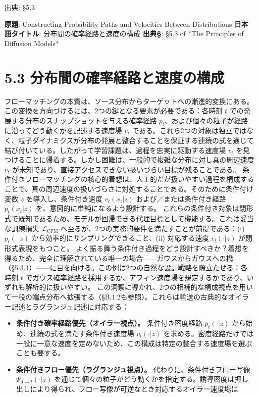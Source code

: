 

{\color{gray}\footnotesize 出典: §5.3\par}
\vspace{0.2em}
\begin{propositionbox}[原題]
\textbf{原題}: Constructing Probability Paths and Velocities Between Distributions
\textbf{日本語タイトル}: 分布間の確率経路と速度の構成
\textbf{出典§}: §5.3 of *The Principles of Diffusion Models*
\end{propositionbox}


\section*{5.3 分布間の確率経路と速度の構成}


フローマッチングの本質は、ソース分布からターゲットへの漸進的変換にある。この変換を方向づけるには、2つの鍵となる要素が必要である：各時刻 $t$ での発展する分布のスナップショットを与える確率経路 $p_t$、および個々の粒子が経路に沿ってどう動くかを記述する速度場 $v_t$ である。これら2つの対象は独立ではなく、粒子ダイナミクスが分布の発展と整合することを保証する連続の式を通じて結び付いている。したがって学習課題は、過程を忠実に駆動する速度場 $v_t$ を見つけることに帰着する。しかし困難は、一般的で複雑な分布に対し真の周辺速度 $v_t$ が未知であり、直接アクセスできない扱いづらい目標が残ることである。
条件付きフローマッチングの核心的着想は、人工的だが扱いやすい過程を構成することで、真の周辺速度の扱いづらさに対処することである。そのために条件付け変数 $z$ を導入し、条件付き速度 $v_t(x_t|z)$ および／または条件付き経路 $p_t(x_t|z)$ を、意図的に単純になるよう設計する。
これらの条件付き対象は閉形式で既知であるため、モデルが回帰できる代理目標として機能する。これは妥当な訓練損失 $\mathcal{L}_{\mathrm{CFM}}$ へ至るが、2つの実務的要件を満たすことが前提である：(i) $p_t(\cdot|z)$ から効率的にサンプリングできること、(ii) 対応する速度 $v_t(\cdot|z)$ が閉形式表現をもつこと。
よく振る舞う条件付き過程をどう設計すべきか？着想を得るため、完全に理解されている唯一の場合——ガウスからガウスへの橋（§5.3.1）——に目を向ける。この例は2つの自然な設計戦略を際立たせる：各時刻 $t$ でガウス確率経路を採用するか、アフィン速度場を規定するかであり、いずれも解析的に扱いやすい。
この洞察に導かれ、2つの相補的な構成視点を用いて一般の端点分布へ拡張する（§B.1.2も参照）。これらは輸送の古典的なオイラー記述とラグランジュ記述に対応する：

\begin{itemize}
\item \textbf{条件付き確率経路優先（オイラー視点）。} 条件付き密度経路 $p_t(\cdot|z)$ から始め、連続の式を満たす条件付き速度場 $v_t(\cdot|z)$ を求める。密度経路だけでは一般に一意な速度を定めないため、この構成は特定の整合する速度場を選ぶことも要する。
\item \textbf{条件付きフロー優先（ラグランジュ視点）。} 代わりに、条件付きフロー写像 $\Psi_{0\to t}(\cdot|z)$ を通じて個々の粒子がどう動くかを指定する。誘導密度は押し出しにより得られ、フロー写像が可逆なとき対応するオイラー速度場は
\end{itemize}

